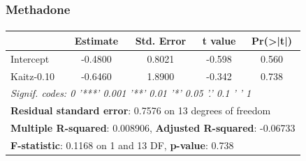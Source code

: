 \begin{frame}[shrink=5]

    \label{table_methadone}
    
    \frametitle{Methadone} %
    \framesubtitle{}  %
    \rmfamily %

    \begin{table}[ht]
        \centering
        \begin{tabular}{lcccc}
        \toprule
         & \textbf{Estimate} & \textbf{Std. Error} & \textbf{t value} & \textbf{Pr(>|t|)} \\
        \midrule
        Intercept  & -0.4800 & 0.8021 & -0.598 & 0.560 \\
        Kaitz-0.10 & -0.6460 & 1.8900 & -0.342 & 0.738 \\
        \midrule
        \multicolumn{5}{l}{\textit{Signif. codes:  0 '***' 0.001 '**' 0.01 '*' 0.05 '.' 0.1 ' ' 1}} \\
        \midrule
        \multicolumn{5}{l}{\textbf{Residual standard error}: 0.7576 on 13 degrees of freedom} \\
        \multicolumn{5}{l}{\textbf{Multiple R-squared}: 0.008906, \textbf{Adjusted R-squared}: -0.06733} \\
        \multicolumn{5}{l}{\textbf{F-statistic}: 0.1168 on 1 and 13 DF, \textbf{p-value}: 0.738} \\
        \bottomrule
        \end{tabular}
    \end{table}
    
    \hyperlink{heroin_result}{}
    
\end{frame}


